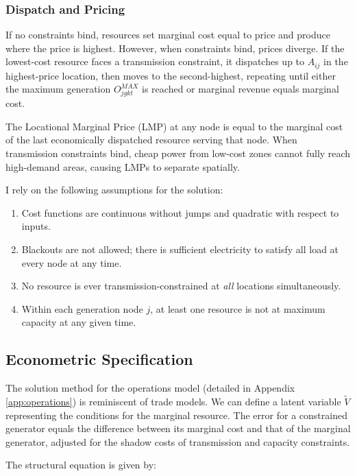 \documentclass[12pt]{article}
\begin{document}
\subsubsection{Dispatch and Pricing}

If no constraints bind, resources set marginal cost equal to price and produce where the price is highest. However, when constraints bind, prices diverge. If the lowest-cost resource faces a transmission constraint, it dispatches up to $A_{ij}$ in the highest-price location, then moves to the second-highest, repeating until either the maximum generation $O_{jgkt}^{MAX}$ is reached or marginal revenue equals marginal cost.

The Locational Marginal Price (LMP) at any node is equal to the marginal cost of the last economically dispatched resource serving that node. When transmission constraints bind, cheap power from low-cost zones cannot fully reach high-demand areas, causing LMPs to separate spatially.

I rely on the following assumptions for the solution:
\begin{enumerate}
    \item Cost functions are continuous without jumps and quadratic with respect to inputs.
    \item Blackouts are not allowed; there is sufficient electricity to satisfy all load at every node at any time.
    \item No resource is ever transmission-constrained at \textit{all} locations simultaneously.
    \item Within each generation node $j$, at least one resource is not at maximum capacity at any given time.
\end{enumerate}

\subsection{Econometric Specification}

The solution method for the operations model (detailed in Appendix \ref{app:operations}) is reminiscent of trade models. We can define a latent variable $\tilde{V}$ representing the conditions for the marginal resource. The error for a constrained generator equals the difference between its marginal cost and that of the marginal generator, adjusted for the shadow costs of transmission and capacity constraints.

The structural equation is given by:
\end{document}
